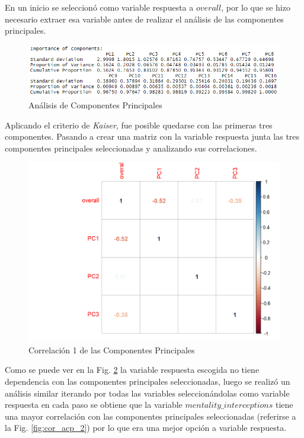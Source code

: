 \documentclass[a4paper,10pt,twocolumn]{article}
\begin{document}
En un inicio se seleccionó como variable respuesta a $overall$, por lo que se hizo necesario extraer esa variable antes de realizar el análisis de las componentes principales.

\begin{figure}[htb]%
	\begin{center}
		\includegraphics[width=\linewidth]{acp_sum}
	\end{center}
	\caption{Análisis de Componentes Principales \label{fig:acp_sum}}%
\end{figure}

Aplicando el criterio de \textit{Kaiser}, fue posible quedarse con las primeras tres componentes. Pasando a crear una matriz con la variable respuesta junta las tres componentes principales seleccionadas y analizando sus correlaciones.

\begin{figure}[htb]%
	\begin{center}
		\includegraphics[width=\linewidth]{cor_acp_1}
	\end{center}
	\caption{Correlación 1 de las Componentes Principales \label{fig:cor_acp_1}}%
\end{figure}

Como se puede ver en la Fig. \ref{fig:cor_acp_1} la variable respuesta escogida no tiene dependencia con las componentes principales seleccionadas, luego se realizó un análisis similar iterando por todas las variables seleccionándolas como variable respuesta en cada paso se obtiene que la variable $mentality\_interceptions$ tiene una mayor correlación con las componentes principales seleccionadas (referirse a la Fig. \ref{fig:cor_acp_2}) por lo que era una mejor opción a variable respuesta.
\end{document}

